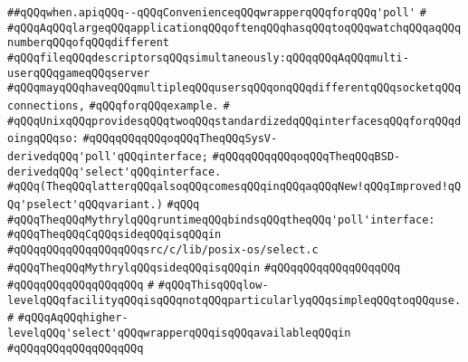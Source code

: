 \label{src/lib/src/when.api}
\verb|##qQQqwhen.apiqQQq--qQQqConvenienceqQQqwrapperqQQqforqQQq'poll'|\newline
\verb|#|\newline
\verb|#qQQqAqQQqlargeqQQqapplicationqQQqoftenqQQqhasqQQqtoqQQqwatchqQQqaqQQqnumberqQQqofqQQqdifferent|\newline
\verb|#qQQqfileqQQqdescriptorsqQQqsimultaneously:qQQqqQQqAqQQqmulti-userqQQqgameqQQqserver|\newline
\verb|#qQQqmayqQQqhaveqQQqmultipleqQQqusersqQQqonqQQqdifferentqQQqsocketqQQqconnections,|\newline
\verb|#qQQqforqQQqexample.|\newline
\verb|#|\newline
\verb|#qQQqUnixqQQqprovidesqQQqtwoqQQqstandardizedqQQqinterfacesqQQqforqQQqdoingqQQqso:|\newline
\verb|#qQQqqQQqqQQqoqQQqTheqQQqSysV-derivedqQQq'poll'qQQqinterface;|\newline
\verb|#qQQqqQQqqQQqoqQQqTheqQQqBSD-derivedqQQq'select'qQQqinterface.|\newline
\verb|#qQQq(TheqQQqlatterqQQqalsoqQQqcomesqQQqinqQQqaqQQqNew!qQQqImproved!qQQq'pselect'qQQqvariant.)|\newline
\verb|#qQQq|\newline
\verb|#qQQqTheqQQqMythrylqQQqruntimeqQQqbindsqQQqtheqQQq'poll'interface:|\newline
\verb|#qQQqTheqQQqCqQQqsideqQQqisqQQqin|\newline
\verb|#qQQqqQQqqQQqqQQqqQQqsrc/c/lib/posix-os/select.c|\newline
\verb|#qQQqTheqQQqMythrylqQQqsideqQQqisqQQqin|\newline
\verb|#qQQqqQQqqQQqqQQqqQQq|\newline
\verb|#qQQqqQQqqQQqqQQqqQQq|\newline
\verb|#|\newline
\verb|#qQQqThisqQQqlow-levelqQQqfacilityqQQqisqQQqnotqQQqparticularlyqQQqsimpleqQQqtoqQQquse.|\newline
\verb|#|\newline
\verb|#qQQqAqQQqhigher-levelqQQq'select'qQQqwrapperqQQqisqQQqavailableqQQqin|\newline
\verb|#qQQqqQQqqQQqqQQqqQQq|\newline

